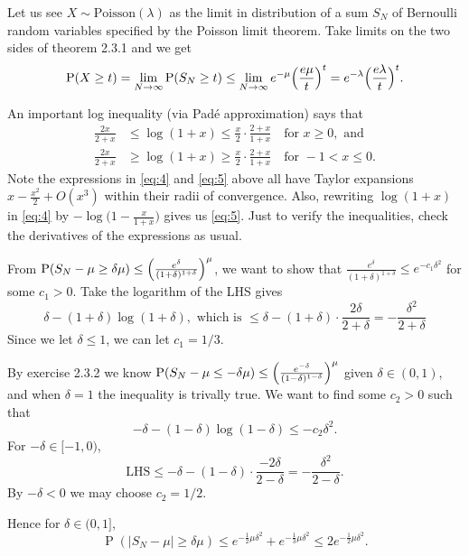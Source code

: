 \documentclass[11pt]{article}
\newcommand{\abs}[1]{\lvert #1 \rvert}
\renewcommand{\Pr}{\operatorname{P}}
\theoremstyle{plain}
\theoremstyle{definition}
\theoremstyle{remark}
\theoremstyle{definition}
\newenvironment{mansol}[1]{%
  \renewcommand\themansolinner{#1}%
  \mansolinner
}{\endmansolinner}
\begin{document}
\begin{mansol}{2.3.3}
Let us see $X \sim \text{Poisson}(\lambda)$ as the limit in distribution of a sum $S_N$ of Bernoulli random variables specified by the Poisson limit theorem. Take limits on the two sides of theorem 2.3.1 and we get \[\Pr(X \geq t) = \lim_{N\to \infty} \Pr(S_N \geq t) \leq \lim_{N\to \infty} e^{-\mu} \Bigl(\frac{e\mu}{t}\Bigr)^t = e^{-\lambda}\Bigl(\frac{e\lambda}{t}\Bigr)^t.\]
\end{mansol}

\begin{mansol}{2.3.5}
    An important log inequality (via Padé approximation) says that 
    \begin{align}
        \frac{2x}{2+x} & \leq \log(1+x) \leq \frac{x}{2}\cdot\frac{2+x}{1+x}\quad \text{for }x\geq 0,\text{ and} \label{eq:4}\\
        \frac{2x}{2+x} & \geq \log(1+x) \geq \frac{x}{2}\cdot\frac{2+x}{1+x}\quad \text{for }-1 < x\leq 0. \label{eq:5}
    \end{align}
    Note the expressions in \eqref{eq:4} and \eqref{eq:5} above all have Taylor expansions $x - \frac{x^2}{2} + O(x^3)$ within their radii of convergence. Also, rewriting $\log(1+x)$ in \eqref{eq:4} by $-\log\bigl(1 - \frac{x}{1+x}\bigr)$ gives us \eqref{eq:5}. Just to verify the inequalities, check the derivatives of the expressions as usual.

    From $\Pr(S_N - \mu \geq \delta \mu) \leq \Bigl(\frac{e^\delta}{(1+\delta)^{1+\delta}}\Bigr)^\mu$, we want to show that $\frac{e^\delta}{(1+\delta)^{1+\delta}} \leq e^{-c_1\delta^2}$ for some $c_1 > 0$. Take the logarithm of the LHS gives \[
    \delta - (1+\delta)\log(1+\delta), \text{ which is } \leq \delta - (1+\delta)\cdot\frac{2\delta}{2+\delta} = -\frac{\delta^2}{2+\delta}
    \]
    Since we let $\delta \leq 1$, we can let $c_1 = 1/3$.

    By exercise 2.3.2 we know $\Pr(S_N - \mu \leq -\delta \mu) \leq \Bigl(\frac{e^{-\delta}}{(1-\delta)^{1-\delta}}\Bigr)^\mu$ given $\delta \in (0,1)$, and when $\delta = 1$ the inequality is trivally true. We want to find some $c_2 > 0$ such that \[
    -\delta - (1-\delta)\log(1-\delta) \leq -c_2 \delta^2.
    \]
    For $-\delta \in [-1,0)$, \[
    \text{LHS} \leq -\delta - (1 -\delta)\cdot \frac{-2\delta}{2-\delta} = -\frac{\delta^2}{2-\delta}.
    \]
    By $-\delta < 0$ we may choose $c_2 = 1/2$. 

    Hence for $\delta \in (0,1]$, \[
    \Pr(\abs{S_N - \mu} \geq \delta \mu) \leq e^{-\frac{1}{2}\mu \delta^2} + e^{-\frac{1}{3}\mu \delta^2} \leq 2 e^{-\frac{1}{2}\mu \delta^2}.
    \]
\end{mansol}
\end{document}
